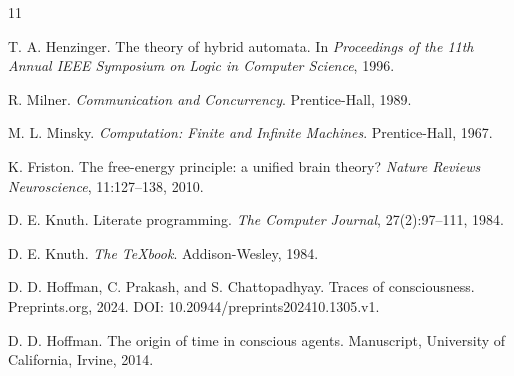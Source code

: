 \documentclass[11pt]{article}
\begin{document}
\begin{thebibliography}{11}

T. A. Henzinger.
\newblock The theory of hybrid automata.
\newblock In \emph{Proceedings of the 11th Annual IEEE Symposium on Logic in
Computer Science}, 1996.

R. Milner.
\newblock \emph{Communication and Concurrency}.
\newblock Prentice-Hall, 1989.

M. L. Minsky.
\newblock \emph{Computation: Finite and Infinite Machines}.
\newblock Prentice-Hall, 1967.

K. Friston.
\newblock The free-energy principle: a unified brain theory?
\newblock \emph{Nature Reviews Neuroscience}, 11:127--138, 2010.

D. E. Knuth.
\newblock Literate programming.
\newblock \emph{The Computer Journal}, 27(2):97--111, 1984.

D. E. Knuth.
\newblock \emph{The TeXbook}.
\newblock Addison-Wesley, 1984.

D. D. Hoffman, C. Prakash, and S. Chattopadhyay.
\newblock Traces of consciousness.
\newblock Preprints.org, 2024. DOI: 10.20944/preprints202410.1305.v1.

D. D. Hoffman.
\newblock The origin of time in conscious agents.
\newblock Manuscript, University of California, Irvine, 2014.

\end{thebibliography}
\end{document}
